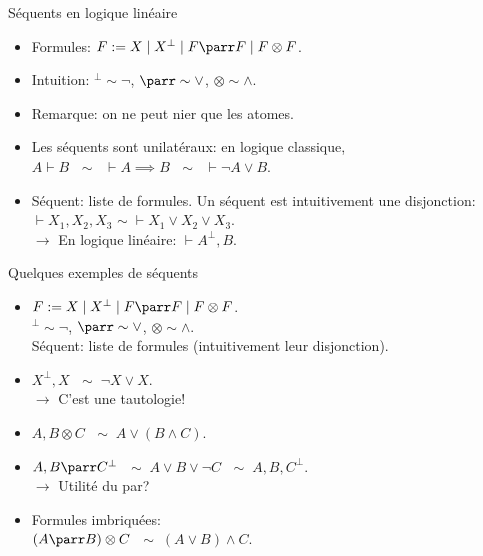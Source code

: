 \documentclass{beamer}
\newcommand*{\orth}{^\perp}
\newcommand*{\tensor}{\otimes}
\begin{document}
\begin{frame}{Séquents en logique linéaire}
    \begin{itemize}
        \item Formules: $F := X \mid X\orth \mid F \parr F \mid F \tensor F$.
            \pause
        \item Intuition: $\orth \sim \neg$, $\parr \sim \lor$, $\tensor \sim \land$.
            \pause
        \item Remarque: on ne peut nier que les atomes.
            \pause \\ 
        \item Les séquents sont unilatéraux: en logique classique, \\ $A \vdash B$ $\; \sim \; \; \vdash A \implies B$ $\; \sim \; \; \vdash \neg A \lor B$.\\         \pause
        \item Séquent: liste de formules. Un séquent est intuitivement une disjonction: $\vdash X_1, X_2, X_3$ $\sim \; \vdash X_1 \lor X_2 \lor X_3$. 
        \pause\\
        $\rightarrow$ En logique linéaire: $\vdash A\orth{}, B$.
    \end{itemize}
\end{frame}

\begin{frame}{Quelques exemples de séquents}
    \begin{itemize}
        \item $F := X \mid X\orth \mid F \parr F \mid F \tensor F$.\\
        $\orth \sim \neg$, $\parr \sim \lor$, $\tensor \sim \land$.\\
        Séquent: liste de formules (intuitivement leur disjonction).
            \pause
        \item $X\orth{}, X$ $\; \sim \; \neg X \lor X$. \\
        \pause $\rightarrow$ C'est une tautologie!
            \pause
        \item $A, B \tensor C$ $\; \sim \; A \lor (B \land C)$.
            \pause
        \item $A,B \parr C\orth{}$ $\; \sim \; A \lor B \lor \neg C$ $\; \sim \; A, B, C\orth{}$. \\
        \pause $\rightarrow$ Utilité du par?
            \pause
        \item Formules imbriquées:\\
        \pause $(A \parr B) \tensor C$ $\; \sim \; (A \lor B) \land C$.
    \end{itemize}
\end{frame}
\end{document}
